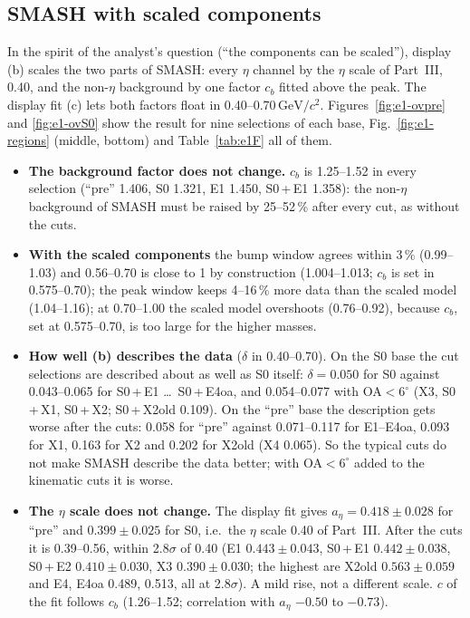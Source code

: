 \documentclass[11pt,a4paper]{article}
\newcommand{\GeVcc}{\ensuremath{\mathrm{GeV}/c^{2}}\xspace}
\newcommand{\cs}[1]{\textsf{#1}}%
\begin{document}
\subsection{SMASH with scaled components}
\label{sec:e1scaled}
In the spirit of the analyst's question (``the components can be scaled''), display (b) scales the two parts of SMASH: every $\eta$ channel by the
$\eta$ scale of Part~III, 0.40, and the non-$\eta$ background by one factor $c_b$ fitted above the peak. The display fit (c) lets both factors
float in 0.40--0.70\,\GeVcc. Figures~\ref{fig:e1-ovpre} and \ref{fig:e1-ovS0} show the result for nine selections of each base,
Fig.~\ref{fig:e1-regions} (middle, bottom) and Table~\ref{tab:e1F} all of them.
\begin{itemize}\setlength{\itemsep}{1pt}
\item \textbf{The background factor does not change.} $c_b$ is 1.25--1.52 in every selection (``pre'' 1.406, S0 1.321, \cs{E1} 1.450,
      S0\,+\,\cs{E1} 1.358): the non-$\eta$ background of SMASH must be raised by 25--52\,\% after every cut, as without the cuts.
\item \textbf{With the scaled components} the bump window agrees within 3\,\% (0.99--1.03) and 0.56--0.70 is close to 1 by construction (1.004--1.013; $c_b$ is set in
      0.575--0.70); the peak window
      keeps 4--16\,\% more data than the scaled model (1.04--1.16); at 0.70--1.00 the scaled model overshoots (0.76--0.92), because $c_b$, set at
      0.575--0.70, is too large for the higher masses.
\item \textbf{How well (b) describes the data} ($\delta$ in 0.40--0.70). On the S0 base the cut selections are described about as well as S0 itself:
      $\delta=0.050$ for S0 against 0.043--0.065 for S0\,+\,\cs{E1} \dots\ S0\,+\,\cs{E4oa}, and 0.054--0.077 with OA$<6^\circ$ (\cs{X3},
      S0\,+\,\cs{X1}, S0\,+\,\cs{X2}; S0\,+\,\cs{X2old} 0.109). On the ``pre'' base the description gets worse after the cuts: 0.058 for ``pre''
      against 0.071--0.117 for \cs{E1}--\cs{E4oa}, 0.093 for \cs{X1}, 0.163 for \cs{X2} and 0.202 for \cs{X2old} (\cs{X4} 0.065). So the typical
      cuts do not make SMASH describe the data better; with OA$<6^\circ$ added to the kinematic cuts it is worse.
\item \textbf{The $\eta$ scale does not change.} The display fit gives $a_\eta=0.418\pm0.028$ for ``pre'' and $0.399\pm0.025$ for S0, i.e.\ the
      $\eta$ scale 0.40 of Part~III. After the cuts it is 0.39--0.56, within 2.8$\sigma$ of 0.40 (\cs{E1} $0.443\pm0.043$, S0\,+\,\cs{E1}
      $0.442\pm0.038$, S0\,+\,\cs{E2} $0.410\pm0.030$, \cs{X3} $0.390\pm0.030$; the highest are \cs{X2old} $0.563\pm0.059$ and \cs{E4}, \cs{E4oa}
      0.489, 0.513, all at 2.8$\sigma$). A mild rise, not a different scale. $c$ of the fit follows $c_b$ (1.26--1.52; correlation with $a_\eta$
      $-0.50$ to $-0.73$).
\end{itemize}
\end{document}
